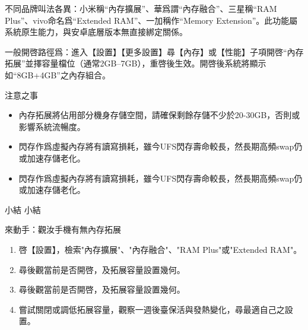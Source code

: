 
不同品牌叫法各異：小米稱“內存擴展”、華爲謂“內存融合”、三星稱“RAM Plus”、vivo命名爲“Extended RAM”、一加稱作“Memory Extension”。此功能屬系統原生能力，與安卓底層版本無直接綁定關係。

一般開啓路徑爲：進入【設置】【更多設置】尋【內存】或【性能】子項開啓“內存拓展”並擇容量檔位（通常2GB–7GB），重啓後生效。開啓後系統將顯示如“8GB+4GB”之內存組合。

\begin{tcbwarn}{注意之事}
\begin{itemize}
  \item 內存拓展將佔用部分機身存儲空間，請確保剩餘存儲不少於20-30GB，否則或影響系統流暢度。
  \item 閃存作爲虛擬內存將有讀寫損耗，雖今UFS閃存壽命較長，然長期高頻swap仍或加速存儲老化。
  \item 閃存作爲虛擬內存將有讀寫損耗，雖今UFS閃存壽命較長，然長期高頻swap仍或加速存儲老化。
\end{itemize}

\end{tcbwarn}

\begin{tcbinfo}{小結}
小結

\end{tcbinfo}

\begin{tcbpractice}{來動手：觀汝手機有無內存拓展}
\begin{enumerate}
  \item 啓【設置】，檢索"內存擴展"、"內存融合"、"RAM Plus"或"Extended RAM"。
  \item 尋後觀當前是否開啓，及拓展容量設置幾何。
  \item 尋後觀當前是否開啓，及拓展容量設置幾何。
  \item 嘗試關閉或調低拓展容量，觀察一週後臺保活與發熱變化，尋最適自己之設置。
\end{enumerate}

\end{tcbpractice}
